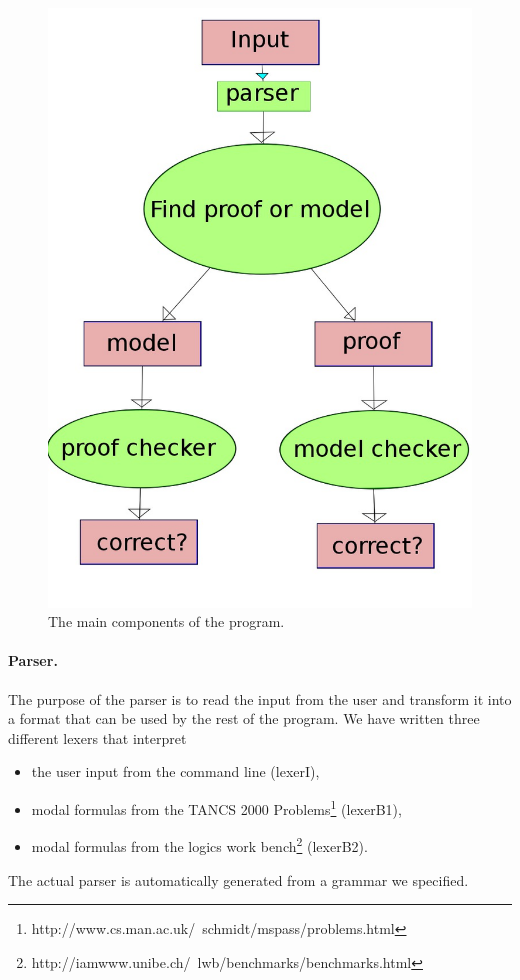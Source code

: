 \begin{figure}
  \caption{The main components of the program.}
  \begin{center}
    \includegraphics[scale=0.4]{design.jpeg}
  \end{center}
  \label{components}
\end{figure}

\paragraph{Parser.}

The purpose of the parser is to read the input from the user
and transform it into a format that can be used by the rest of the program. We have
written three different lexers that interpret
\begin{itemize}
\item the user input from the command line (lexerI),
\item modal formulas from the TANCS 2000 Problems\footnote{http://www.cs.man.ac.uk/~schmidt/mspass/problems.html} (lexerB1),
\item modal formulas from the logics work bench\footnote{http://iamwww.unibe.ch/~lwb/benchmarks/benchmarks.html} (lexerB2).
\end{itemize} 
The actual parser is automatically generated from a grammar we specified.

